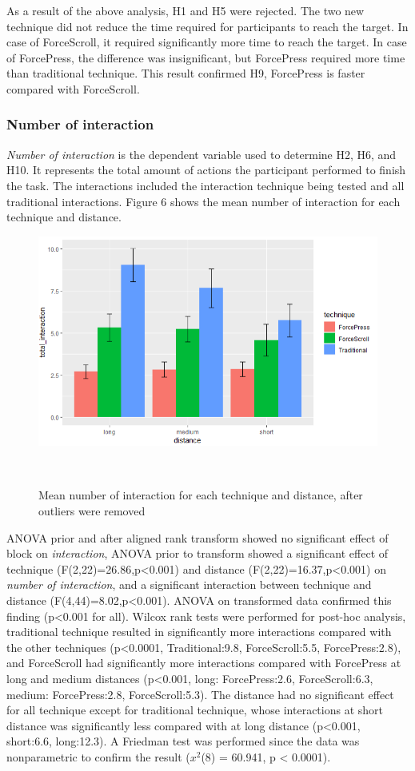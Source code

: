 \documentclass{sigchi}
\begin{document}
As a result of the above analysis, H1 and H5 were rejected. The two new technique did not reduce the time required for participants to reach the target. In case of ForceScroll, it required significantly more time to reach the target. In case of ForcePress, the difference was insignificant, but ForcePress required more time than traditional technique. This result confirmed H9, ForcePress is faster compared with ForceScroll.


\subsubsection{Number of interaction}
\textit{Number of interaction} is the dependent variable used to determine H2, H6, and H10. It represents the total amount of actions the participant performed to finish the task. The interactions included the interaction technique being tested and all traditional interactions. Figure 6 shows the mean number of interaction for each technique and distance. 
\begin{figure}[!h]
	\centering
	\includegraphics[width=0.8\columnwidth]{figures/figure5}
	\caption{Mean number of interaction for each technique and distance, after outliers were removed}~\label{fig:figure6}
\end{figure}

ANOVA prior and after aligned rank transform showed no significant effect of block on \textit{interaction}, ANOVA prior to transform showed a significant effect of technique (F(2,22)=26.86,p<0.001) and distance (F(2,22)=16.37,p<0.001) on \textit{number of interaction}, and a significant interaction between technique and distance (F(4,44)=8.02,p<0.001). ANOVA on transformed data confirmed this finding (p<0.001 for all). Wilcox rank tests were performed for post-hoc analysis, traditional technique resulted in significantly more interactions compared with the other techniques (p<0.0001, Traditional:9.8, ForceScroll:5.5, ForcePress:2.8), and ForceScroll had significantly more interactions compared with ForcePress at long and medium distances (p<0.001, long: ForcePress:2.6, ForceScroll:6.3, medium: ForcePress:2.8, ForceScroll:5.3). The distance had no significant effect for all technique except for traditional technique, whose interactions at short distance was significantly less compared with at long distance (p<0.001, short:6.6, long:12.3). A Friedman test was performed since the data was nonparametric to confirm the result ($x^{2}$(8) = 60.941, p < 0.0001).%
\end{document}
